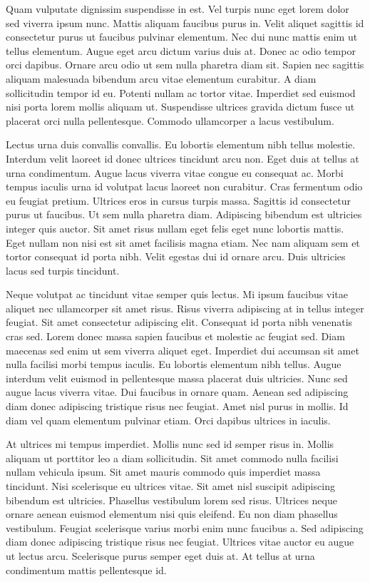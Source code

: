 \documentclass[11pt,a4paper]{article}
\begin{document}
Quam vulputate dignissim suspendisse in est. Vel turpis nunc eget lorem dolor sed viverra ipsum nunc. Mattis aliquam faucibus purus in. Velit aliquet sagittis id consectetur purus ut faucibus pulvinar elementum. Nec dui nunc mattis enim ut tellus elementum. Augue eget arcu dictum varius duis at. Donec ac odio tempor orci dapibus. Ornare arcu odio ut sem nulla pharetra diam sit. Sapien nec sagittis aliquam malesuada bibendum arcu vitae elementum curabitur. A diam sollicitudin tempor id eu. Potenti nullam ac tortor vitae. Imperdiet sed euismod nisi porta lorem mollis aliquam ut. Suspendisse ultrices gravida dictum fusce ut placerat orci nulla pellentesque. Commodo ullamcorper a lacus vestibulum.

Lectus urna duis convallis convallis. Eu lobortis elementum nibh tellus molestie. Interdum velit laoreet id donec ultrices tincidunt arcu non. Eget duis at tellus at urna condimentum. Augue lacus viverra vitae congue eu consequat ac. Morbi tempus iaculis urna id volutpat lacus laoreet non curabitur. Cras fermentum odio eu feugiat pretium. Ultrices eros in cursus turpis massa. Sagittis id consectetur purus ut faucibus. Ut sem nulla pharetra diam. Adipiscing bibendum est ultricies integer quis auctor. Sit amet risus nullam eget felis eget nunc lobortis mattis. Eget nullam non nisi est sit amet facilisis magna etiam. Nec nam aliquam sem et tortor consequat id porta nibh. Velit egestas dui id ornare arcu. Duis ultricies lacus sed turpis tincidunt.

Neque volutpat ac tincidunt vitae semper quis lectus. Mi ipsum faucibus vitae aliquet nec ullamcorper sit amet risus. Risus viverra adipiscing at in tellus integer feugiat. Sit amet consectetur adipiscing elit. Consequat id porta nibh venenatis cras sed. Lorem donec massa sapien faucibus et molestie ac feugiat sed. Diam maecenas sed enim ut sem viverra aliquet eget. Imperdiet dui accumsan sit amet nulla facilisi morbi tempus iaculis. Eu lobortis elementum nibh tellus. Augue interdum velit euismod in pellentesque massa placerat duis ultricies. Nunc sed augue lacus viverra vitae. Dui faucibus in ornare quam. Aenean sed adipiscing diam donec adipiscing tristique risus nec feugiat. Amet nisl purus in mollis. Id diam vel quam elementum pulvinar etiam. Orci dapibus ultrices in iaculis.

At ultrices mi tempus imperdiet. Mollis nunc sed id semper risus in. Mollis aliquam ut porttitor leo a diam sollicitudin. Sit amet commodo nulla facilisi nullam vehicula ipsum. Sit amet mauris commodo quis imperdiet massa tincidunt. Nisi scelerisque eu ultrices vitae. Sit amet nisl suscipit adipiscing bibendum est ultricies. Phasellus vestibulum lorem sed risus. Ultrices neque ornare aenean euismod elementum nisi quis eleifend. Eu non diam phasellus vestibulum. Feugiat scelerisque varius morbi enim nunc faucibus a. Sed adipiscing diam donec adipiscing tristique risus nec feugiat. Ultrices vitae auctor eu augue ut lectus arcu. Scelerisque purus semper eget duis at. At tellus at urna condimentum mattis pellentesque id.
\end{document}

